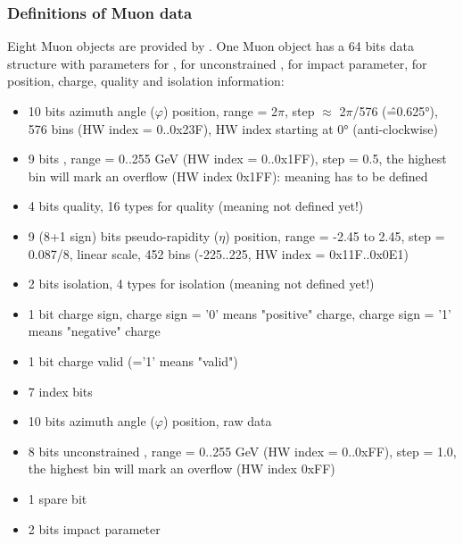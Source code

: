 \subsubsection{Definitions of Muon data}
\label{sec:gtl:muon_data}
Eight Muon objects are provided by \gmt. One Muon object has a 64 bits data structure with parameters for \pt, for unconstrained \pt, for impact parameter, for position, charge, quality and isolation information:
\begin{itemize}
\item 10 bits azimuth angle ($\varphi$) position, range = 2$\pi$, step $\approx$ 2$\pi$/576 (\^=0.625°), 576 bins (HW index = 0..0x23F), HW index starting at 0° (anti-clockwise)
\item 9 bits \pt, range = 0..255 GeV (HW index = 0..0x1FF), step = 0.5, the highest bin will mark an overflow (HW index 0x1FF): meaning has to be defined
\item 4 bits quality, 16 types for quality (meaning not defined yet!)
\item 9 (8+1 sign) bits pseudo-rapidity ($\eta$) position, range = -2.45 to 2.45, step = 0.087/8, linear scale, 452 bins (-225..225, HW index = 0x11F..0x0E1)
\item 2 bits isolation, 4 types for isolation (meaning not defined yet!)
\item 1 bit charge sign, charge sign = '0' means "positive" charge, charge sign = '1' means "negative" charge
\item 1 bit charge valid (='1' means "valid")
\item 7 index bits
\item 10 bits azimuth angle ($\varphi$) position, raw data
\item 8 bits unconstrained \pt, range = 0..255 GeV (HW index = 0..0xFF), step = 1.0, the highest bin will mark an overflow (HW index 0xFF)
\item 1 spare bit
\item 2 bits impact parameter
\end{itemize}

